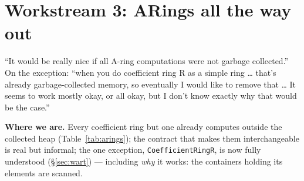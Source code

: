 \documentclass[11pt,oneside]{report}
\newcommand{\code}[1]{\textcolor{m2code}{\texttt{#1}}}
\begin{document}
\section{Workstream 3: ARings all the way out}
\label{sec:ws-aring}

\begin{mikesays}
``It would be really nice if all A-ring computations were not garbage
collected.'' On the exception: ``when you do coefficient ring R as a
simple ring \ldots{} that's already garbage-collected memory, so eventually
I would like to remove that \ldots{} It seems to work mostly okay, or all
okay, but I don't know exactly why that would be the case.''
\end{mikesays}

\textbf{Where we are.} Every coefficient ring but one already computes
outside the collected heap (Table~\ref{tab:arings}); the contract
that makes them interchangeable is real but informal; the one exception,
\code{CoefficientRingR}, is now fully understood (\S\ref{sec:wart}) ---
including \emph{why} it works: the containers holding its elements are
scanned.
\end{document}
